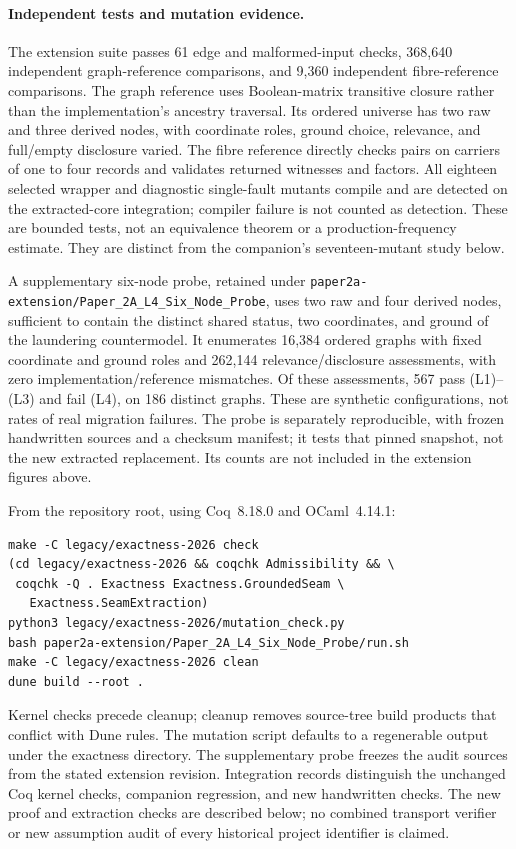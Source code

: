 \documentclass[11pt]{article}
\theoremstyle{definition}
\begin{document}
\paragraph{Independent tests and mutation evidence.}
The extension suite passes 61 edge and malformed-input checks, 368,640 independent graph-reference comparisons, and 9,360 independent fibre-reference comparisons. The graph reference uses Boolean-matrix transitive closure rather than the implementation's ancestry traversal. Its ordered universe has two raw and three derived nodes, with coordinate roles, ground choice, relevance, and full/empty disclosure varied. The fibre reference directly checks pairs on carriers of one to four records and validates returned witnesses and factors. All eighteen selected wrapper and diagnostic single-fault mutants compile and are detected on the extracted-core integration; compiler failure is not counted as detection. These are bounded tests, not an equivalence theorem or a production-frequency estimate. They are distinct from the companion's seventeen-mutant study below.

A supplementary six-node probe, retained under \nolinkurl{paper2a-extension/Paper_2A_L4_Six_Node_Probe}, uses two raw and four derived nodes, sufficient to contain the distinct shared status, two coordinates, and ground of the laundering countermodel. It enumerates 16,384 ordered graphs with fixed coordinate and ground roles and 262,144 relevance/disclosure assessments, with zero implementation/reference mismatches. Of these assessments, 567 pass (L1)--(L3) and fail (L4), on 186 distinct graphs. These are synthetic configurations, not rates of real migration failures. The probe is separately reproducible, with frozen handwritten sources and a checksum manifest; it tests that pinned snapshot, not the new extracted replacement. Its counts are not included in the extension figures above.

From the repository root, using Coq~8.18.0 and OCaml~4.14.1:
\begin{verbatim}
make -C legacy/exactness-2026 check
(cd legacy/exactness-2026 && coqchk Admissibility && \
 coqchk -Q . Exactness Exactness.GroundedSeam \
   Exactness.SeamExtraction)
python3 legacy/exactness-2026/mutation_check.py
bash paper2a-extension/Paper_2A_L4_Six_Node_Probe/run.sh
make -C legacy/exactness-2026 clean
dune build --root .
\end{verbatim}
Kernel checks precede cleanup; cleanup removes source-tree build products that conflict with Dune rules. The mutation script defaults to a regenerable output under the exactness directory. The supplementary probe freezes the audit sources from the stated extension revision. Integration records distinguish the unchanged Coq kernel checks, companion regression, and new handwritten checks. The new proof and extraction checks are described below; no combined transport verifier or new assumption audit of every historical project identifier is claimed.
\end{document}
